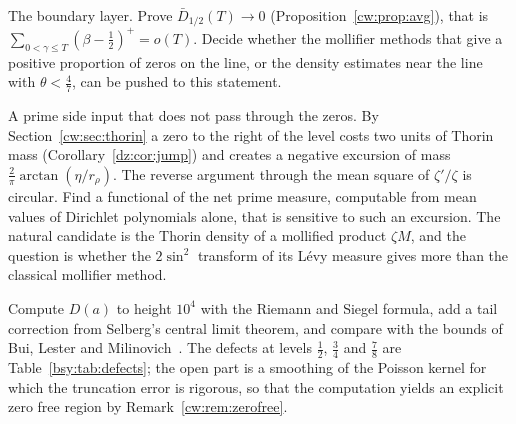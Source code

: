 \begin{problem}\label{cw:prob:layer}
The boundary layer. Prove $\bar D_{1/2}(T)\to0$ (Proposition~\ref{cw:prop:avg}), that is $\sum_{0<\gamma\le T}(\beta-\frac12)^+=o(T)$. Decide whether the mollifier methods that give a positive proportion of zeros on the line, or the density estimates near the line with $\theta<\frac47$, can be pushed to this statement.
\end{problem}

\begin{problem}\label{cw:prob:input}
A prime side input that does not pass through the zeros. By Section~\ref{cw:sec:thorin} a zero to the right of the level costs two units of Thorin mass (Corollary~\ref{dz:cor:jump}) and creates a negative excursion of mass $\frac2\pi\arctan(\eta/r_\rho)$. The reverse argument through the mean square of $\zeta'/\zeta$ is circular. Find a functional of the net prime measure, computable from mean values of Dirichlet polynomials alone, that is sensitive to such an excursion. The natural candidate is the Thorin density of a mollified product $\zeta M$, and the question is whether the $2\sin^2$ transform of its L\'evy measure gives more than the classical mollifier method.
\end{problem}

\begin{problem}
Compute $D(a)$ to height $10^4$ with the Riemann and Siegel formula, add a tail correction from Selberg's central limit theorem, and compare with the bounds of Bui, Lester and Milinovich~\cite{BLM14}. The defects at levels $\frac12$, $\frac34$ and $\frac78$ are Table~\ref{bsy:tab:defects}; the open part is a smoothing of the Poisson kernel for which the truncation error is rigorous, so that the computation yields an explicit zero free region by Remark~\ref{cw:rem:zerofree}.
\end{problem}

